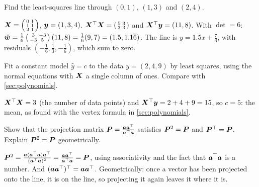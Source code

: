 \begin{exercise}
Find the least-squares line through $(0, 1)$, $(1, 3)$ and $(2, 4)$.
\end{exercise}
\begin{solution}
$\bm{X} = \left(\begin{smallmatrix} 0 & 1\\ 1 & 1\\ 2 & 1\end{smallmatrix}\right)$,
$\bm{y} = (1, 3, 4)$. $\bm{X}^\top\bm{X} = \left(\begin{smallmatrix} 5 & 3\\ 3 &
3\end{smallmatrix}\right)$ and $\bm{X}^\top\bm{y} = (11, 8)$. With $\det = 6$:
$\hat{\bm{w}} = \tfrac16\left(\begin{smallmatrix} 3 & -3\\ -3 &
5\end{smallmatrix}\right)(11, 8) = \tfrac16(9, 7) = (1.5, 1.1\overline{6})$. The
line is $y = 1.5x + \tfrac76$, with residuals $(-\tfrac16, \tfrac13,
-\tfrac16)$, which sum to zero.
\end{solution}

\begin{exercise}
Fit a constant model $\hat y = c$ to the data $y = (2, 4, 9)$ by least squares,
using the normal equations with $\bm{X}$ a single column of ones. Compare with
\cref{sec:polynomials}.
\end{exercise}
\begin{solution}
$\bm{X}^\top\bm{X} = 3$ (the number of data points) and $\bm{X}^\top\bm{y} = 2 + 4 + 9 =
15$, so $c = 5$: the mean, as found with the vertex formula in
\cref{sec:polynomials}.
\end{solution}

\begin{exercise}
Show that the projection matrix $\bm{P} = \frac{\bm{a}\bm{a}^\top}{\bm{a}^\top\bm{a}}$
satisfies $\bm{P}^2 = \bm{P}$ and $\bm{P}^\top = \bm{P}$. Explain $\bm{P}^2 = \bm{P}$
geometrically.
\end{exercise}
\begin{solution}
$\bm{P}^2 = \frac{\bm{a}(\bm{a}^\top\bm{a})\bm{a}^\top}{(\bm{a}^\top\bm{a})^2} =
\frac{\bm{a}\bm{a}^\top}{\bm{a}^\top\bm{a}} = \bm{P}$, using associativity and the fact that
$\bm{a}^\top\bm{a}$ is a number. And $(\bm{a}\bm{a}^\top)^\top = \bm{a}\bm{a}^\top$. Geometrically:
once a vector has been projected onto the line, it is on the line, so
projecting it again leaves it where it is.
\end{solution}

